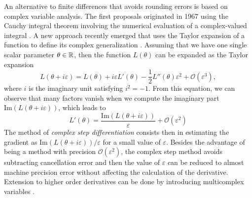 An alternative to finite differences that avoids rounding errors is based on complex variable analysis. 
The first proposals originated in 1967 using the Cauchy integral theorem involving the numerical evaluation of a complex-valued integral \cite{Lyness_1967, Lyness_Moler_1967}.
A new approach recently emerged that uses the Taylor expansion of a function to define its complex generalization \cite{Squire_Trapp_1998_complex_diff, Martins_Sturdza_Alonso_2003_complex_differentiation}. 
Assuming that we have one single scalar parameter $\theta \in \operatorname{\mathbb{R}}$, then the function $L(\theta)$ can be expanded as 
the Taylor expansion
\begin{equation}
    L(\theta + i \varepsilon)
    = 
    L(\theta) + i \varepsilon L'(\theta) 
    - 
    \frac 1 2
    L''(\theta) \varepsilon^2
    + 
    \mathcal O (\varepsilon^3),
\end{equation}
where $i$ is the imaginary unit satisfying $i^2 = -1$. 
From this equation, we can observe that many factors vanish when we compute the imaginary part $\text{Im}(L(\theta + i \varepsilon))$, which leads to
\begin{equation}
    L'(\theta) 
    = 
    \frac{\text{Im}(L(\theta + i \varepsilon))}{\varepsilon}
    + 
    \mathcal{O} (\varepsilon^2)
\end{equation}
The method of \textit{complex step differentiation} consists then in estimating the gradient as $\text{Im}(L(\theta + i \varepsilon)) / \varepsilon$ for a small value of $\varepsilon$. 
Besides the advantage of being a method with precision $\mathcal{O}(\varepsilon^2)$, the complex step method avoids subtracting cancellation error and then the value of $\varepsilon$ can be reduced to almost machine precision error without affecting the calculation of the derivative. 
Extension to higher order derivatives can be done by introducing multicomplex variables \cite{Lantoine_Russell_Dargent_2012}. 

